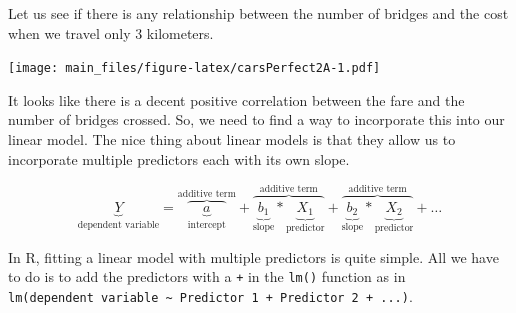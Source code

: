 \documentclass[
]{book}
\newenvironment{Shaded}{\begin{snugshade}}{\end{snugshade}}
\newcommand{\FunctionTok}[1]{\textcolor[rgb]{0.13,0.29,0.53}{\textbf{#1}}}
\newcommand{\NormalTok}[1]{#1}
\newcommand{\OtherTok}[1]{\textcolor[rgb]{0.56,0.35,0.01}{#1}}
\newcommand{\SpecialCharTok}[1]{\textcolor[rgb]{0.81,0.36,0.00}{\textbf{#1}}}
\begin{document}
Let us see if there is any relationship between the number of bridges and the cost when we travel only 3 kilometers.

\texttt{[image: main\_files/figure-latex/carsPerfect2A-1.pdf]}

It looks like there is a decent positive correlation between the fare and the number of bridges crossed. So, we need to find a way to incorporate this into our linear model. The nice thing about linear models is that they allow us to incorporate multiple predictors each with its own slope.

\[ \underbrace{Y}_{\text{dependent variable}} =
            \overbrace{\underbrace{a}_{\text{intercept}}}^{\text{additive term}} + 
            \overbrace{\underbrace{b_1}_{\text{slope}} * \underbrace{X_{1}}_{\text{predictor}}}^{\text{additive term}} + 
            \overbrace{\underbrace{b_2}_{\text{slope}} * \underbrace{X_{2} }_{\text{predictor}}}^{\text{additive term}} +  
            \ldots\]

In R, fitting a linear model with multiple predictors is quite simple. All we have to do is to add the predictors with a \texttt{+} in the \texttt{lm()} function as in \texttt{lm(dependent\ variable\ \textasciitilde{}\ Predictor\ 1\ +\ Predictor\ 2\ +\ ...)}.

\begin{Shaded}
\end{Shaded}

\begin{Shaded}
\end{Shaded}
\end{document}
